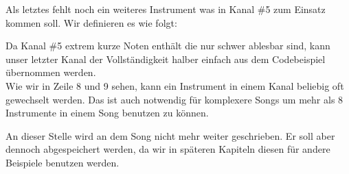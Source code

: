 \medskip



\medskip

Als letztes fehlt noch ein weiteres Instrument was in Kanal \#5 zum Einsatz kommen soll. Wir definieren es wie folgt:

\medskip



\medskip

Da Kanal \#5 extrem kurze Noten enthält die nur schwer ablesbar sind, kann unser letzter Kanal der Vollständigkeit halber einfach aus dem Codebeispiel übernommen werden. \\
Wie wir in Zeile 8 und 9 sehen, kann ein Instrument in einem Kanal beliebig oft gewechselt werden.
Das ist auch notwendig für komplexere Songs um mehr als 8 Instrumente in einem Song benutzen zu können.

\newpage



\medskip

An dieser Stelle wird an dem Song nicht mehr weiter geschrieben. Er soll aber dennoch abgespeichert werden, da wir in späteren Kapiteln diesen für andere Beispiele benutzen werden.